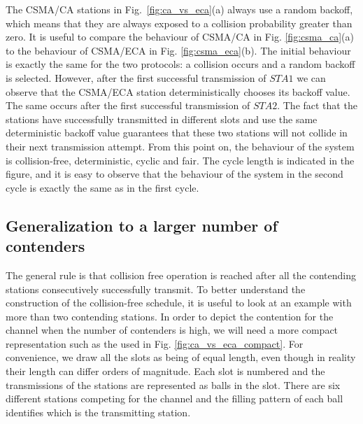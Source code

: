 \documentclass[journal]{IEEEtran}
\begin{document}
The CSMA/CA stations in Fig.~\ref{fig:ca_vs_eca}(a) always use a random backoff, which means that they are always exposed to a collision probability greater than zero.
%
It is useful to compare the behaviour of CSMA/CA in Fig. \ref{fig:csma_ca}(a) to the behaviour of CSMA/ECA in Fig. \ref{fig:csma_eca}(b).
The initial behaviour is exactly the same for the two protocols: a collision occurs and a random backoff is selected.
However, after the first successful transmission of $STA 1$ we can observe that the CSMA/ECA station deterministically chooses its backoff value.
The same occurs after the first successful transmission of $STA 2$.
The fact that the stations have successfully transmitted in different slots and use the same deterministic backoff value guarantees that these two stations will not collide in their next transmission attempt.
From this point on, the behaviour of the system is collision-free, deterministic, cyclic and fair.
The cycle length is indicated in the figure, and it is easy to observe that the behaviour of the system in the second cycle is exactly the same as in the first cycle.

\subsection{Generalization to a larger number of contenders}
The general rule is that collision free operation is reached after all the contending stations consecutively successfully transmit.
To better understand the construction of the collision-free schedule, it is useful to look at an example with more than two contending stations.
In order to depict the contention for the channel when the number of contenders is high, we will need a more compact representation such as the used in Fig. \ref{fig:ca_vs_eca_compact}.
For convenience, we draw all the slots as being of equal length, even though in reality their length can differ orders of magnitude.
Each slot is numbered and the transmissions of the stations are represented as balls in the slot.
There are six different stations competing for the channel and the filling pattern of each ball identifies which is the transmitting station.
\end{document}
